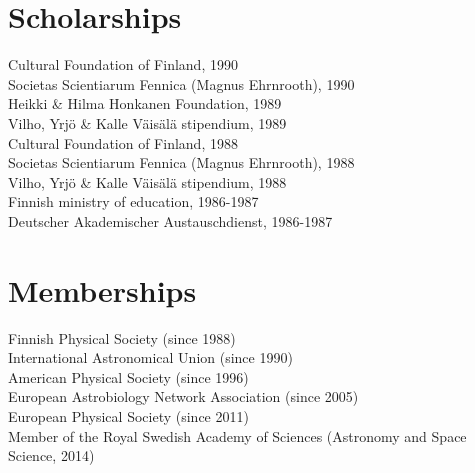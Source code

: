 \documentclass{article}
\begin{document}

\section*{Scholarships}


Cultural Foundation of Finland, 1990\\ 
Societas Scientiarum Fennica (Magnus Ehrnrooth), 1990\\ 
Heikki \& Hilma Honkanen Foundation, 1989\\ 
Vilho, Yrj\"o \& Kalle V\"ais\"al\"a stipendium, 1989\\ 
Cultural Foundation of Finland, 1988\\ 
Societas Scientiarum Fennica (Magnus Ehrnrooth), 1988\\ 
Vilho, Yrj\"o \& Kalle V\"ais\"al\"a stipendium, 1988\\ 
Finnish ministry of education, 1986-1987\\ 
Deutscher Akademischer Austauschdienst, 1986-1987\\ 

\section*{Memberships}

Finnish Physical Society (since 1988) \\
International Astronomical Union (since 1990) \\
American Physical Society (since 1996) \\
European Astrobiology Network Association (since 2005) \\
European Physical Society (since 2011) \\
Member of the Royal Swedish Academy of Sciences (Astronomy and Space Science, 2014)\\
\end{document}
